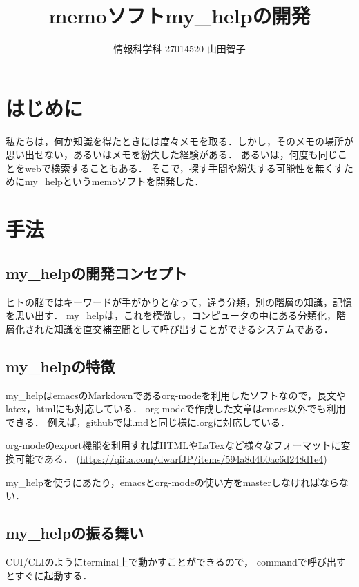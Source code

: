 \documentclass[a4j,twocolumn]{jsarticle}
\begin{document}
\title{memoソフトmy\_helpの開発}
\author{情報科学科 \hspace{5mm} 27014520 \hspace{5mm}山田智子}
\date{}
\maketitle

\section{はじめに}
私たちは，何か知識を得たときには度々メモを取る．しかし，そのメモの場所が思い出せない，あるいはメモを紛失した経験がある．
あるいは，何度も同じことをwebで検索することもある．
そこで，探す手間や紛失する可能性を無くすためにmy\_helpというmemoソフトを開発した．

\section{手法}
\subsection{my\_helpの開発コンセプト}
\label{sec-2-1}
ヒトの脳ではキーワードが手がかりとなって，違う分類，別の階層の知識，記憶を思い出す．
my\_helpは，これを模倣し，コンピュータの中にある分類化，階層化された知識を直交補空間として呼び出すことができるシステムである．

\subsection{my\_helpの特徴}
\label{sec-2-2}
my\_helpはemacsのMarkdownであるorg-modeを利用したソフトなので，長文やlatex，htmlにも対応している．
org-modeで作成した文章はemacs以外でも利用できる．
例えば，githubでは.mdと同じ様に.orgに対応している．

org-modeのexport機能を利用すればHTMLやLaTexなど様々なフォーマットに変換可能である．
(\url{https://qiita.com/dwarfJP/items/594a8d4b0ac6d248d1e4})

my\_helpを使うにあたり，emacsとorg-modeの使い方をmasterしなければならない．



\subsection{my\_helpの振る舞い}
\label{sec-2-3}
CUI/CLIのようにterminal上で動かすことができるので，
commandで呼び出すとすぐに起動する．
\end{document}
